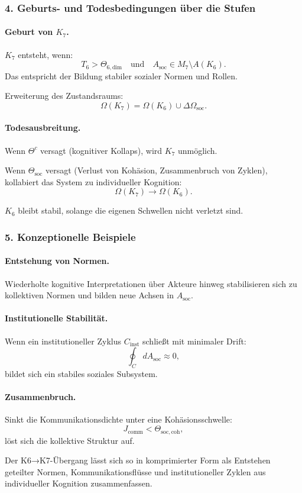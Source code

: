 \subsubsection{4. Geburts- und Todesbedingungen über die Stufen}

\paragraph{Geburt von \texorpdfstring{$K_7$}{K_7}.}
$K_7$ entsteht, wenn:
\[
T_6 > \Theta_{6,\mathrm{dim}}
\quad\text{und}\quad
A_{\mathrm{soc}} \in M_7 \setminus A(K_6).
\]
Das entspricht der Bildung stabiler sozialer Normen und Rollen.

Erweiterung des Zustandsraums:
\[
\Omega(K_7) = \Omega(K_6) \cup \Delta\Omega_{\mathrm{soc}}.
\]

\paragraph{Todesausbreitung.}
Wenn $\Theta^{c}$ versagt (kognitiver Kollaps), wird $K_7$ unmöglich.

Wenn $\Theta_{\mathrm{soc}}$ versagt (Verlust von Kohäsion, Zusammenbruch von
Zyklen), kollabiert das System zu individueller Kognition:
\[
\Omega(K_7) \rightarrow \Omega(K_6).
\]

$K_6$ bleibt stabil, solange die eigenen Schwellen nicht verletzt sind.

\subsubsection{5. Konzeptionelle Beispiele}

\paragraph{Entstehung von Normen.}
Wiederholte kognitive Interpretationen über Akteure hinweg stabilisieren sich zu
kollektiven Normen und bilden neue Achsen in $A_{\mathrm{soc}}$.

\paragraph{Institutionelle Stabilität.}
Wenn ein institutioneller Zyklus $C_{\mathrm{inst}}$ schließt mit minimaler Drift:
\[
\oint_C dA_{\mathrm{soc}} \approx 0,
\]
bildet sich ein stabiles soziales Subsystem.

\paragraph{Zusammenbruch.}
Sinkt die Kommunikationsdichte unter eine Kohäsionsschwelle:
\[
J_{\mathrm{comm}} < \Theta_{\mathrm{soc,coh}},
\]
löst sich die kollektive Struktur auf.

Der K6→K7-Übergang lässt sich so in komprimierter Form als Entstehen geteilter
Normen, Kommunikationsflüsse und institutioneller Zyklen aus individueller Kognition
zusammenfassen.
